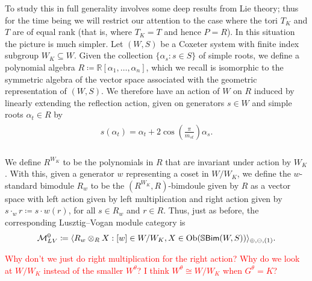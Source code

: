 \noindent To study this in full generality involves some deep results from Lie theory; thus for the time being we will restrict our attention to the case where the tori $T_K$ and $T$ are of equal rank (that is, where $T_K = T$ and hence $P = R$). In this situation the picture is much simpler. Let $(W, S)$ be a Coxeter system with finite index subgroup $W_K \subseteq W$. Given the collection $\{\alpha_s : s \in S\}$ of simple roots, we define a polynomial algebra $R \coloneqq \mathbb{R}[\alpha_1, \dots, \alpha_n]$, which we recall is isomorphic to the symmetric algebra of the vector space associated with the geometric representation of $(W, S)$. We therefore have an action of $W$ on $R$ induced by linearly extending the reflection action, given on generators $s \in W$ and simple roots $\alpha_t \in R$ by\\[-1.1\linespacing]
\begin{align*}
\begin{split}
s(\alpha_t) = \alpha_t + 2\cos\!\left(\frac{\pi}{m_{st}}\right)\!\alpha_s.
\end{split}
\end{align*}
\noindent\\[-0.6\linespacing] We define $R^{W_K}$ to be the polynomials in $R$ that are invariant under action by $W_K$. With this, given a generator $w$ representing a coset in $W/W_K$, we define the $w$-standard bimodule $R_w$ to be the $(R^{W_K}, R)$-bimdoule given by $R$ as a vector space with left action given by left multiplication and right action given by $s \cdot_w r \coloneqq s \cdot w(r)$, for all $s \in R_w$ and $r \in R$. Thus, just as before, the corresponding Lusztig--Vogan module category is
\begin{align*}
\begin{split}
\mathcal{M}_{LV}^0 \coloneqq \langle R_w \otimes_R X : [w] \in W/W_K, X \in \textnormal{Ob}(\mathbb{S}\textnormal{\textsf{Bim}}(W, S))\rangle_{\oplus,\ominus,(1)}.
\end{split}
\end{align*}
\newpage

\noindent\textcolor{red}{Why don't we just do right multiplication for the right action? Why do we look at $W/W_K$ instead of the smaller $W^\theta$? I think $W^\theta \cong W/W_K$ when $G^\theta = K$?}\\

